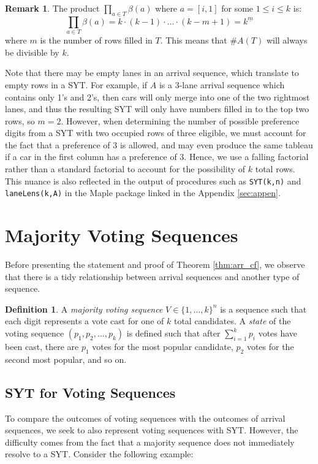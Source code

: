 \documentclass[article]{amsart}
\theoremstyle{plain}
\theoremstyle{definition}
\newtheorem{definition}{Definition}
\newtheorem{remark}[proposition]{Remark}
\begin{document}
\begin{remark}
    The product $\prod_{a \in T} \beta(a)$ where $a = [i,1]$ for some $1 \leq i \leq k$ is:
    $$\prod_{a \in T} \beta(a) = k \cdot (k-1) \cdot \dots \cdot (k-m+1) = k^{\underline{m}}$$
    where $m$ is the number of rows filled in $T$. This means that $\#A(T)$ will always be divisible by $k$. 
    
    Note that there may be empty lanes in an arrival sequence, which translate to empty rows in a SYT. For example, if $A$ is a 3-lane arrival sequence which contains only 1's and 2's, then cars will only merge into one of the two rightmost lanes, and thus the resulting SYT will only have numbers filled in to the top two rows, so $m=2$. However, when determining the number of possible preference digits from a SYT with two occupied rows of three eligible, we must account for the fact that a preference of 3 is allowed, and may even produce the same tableau if a car in the first column has a preference of 3. Hence, we use a falling factorial rather than a standard factorial to account for the possibility of $k$ total rows. This nuance is also reflected in the output of procedures such as \texttt{SYT(k,n)} and \texttt{laneLens(k,A)} in the Maple package linked in the Appendix \ref{sec:appen}.
\end{remark}

\section{Majority Voting Sequences} \label{sec:voting}

Before presenting the statement and proof of Theorem \ref{thm:arr_cf}, we observe that there is a tidy relationship between arrival sequences and another type of sequence.

\begin{definition} \label{def:vote_seq}
    A \textit{majority voting sequence} $V \in \{1,\dots,k\}^n$ is a sequence such that each digit represents a vote cast for one of $k$ total candidates. A \textit{state} of the voting sequence $(p_1, p_2, \dots, p_k)$ is defined such that after $\sum_{i=1}^k p_i$ votes have been cast, there are $p_1$ votes for the most popular candidate, $p_2$ votes for the second most popular, and so on.
\end{definition}

\subsection{SYT for Voting Sequences} \label{sub:voting_syt}
To compare the outcomes of voting sequences with the outcomes of arrival sequences, we seek to also represent voting sequences with SYT. However, the difficulty comes from the fact that a majority sequence does not immediately resolve to a SYT. Consider the following example: 
\end{document}
